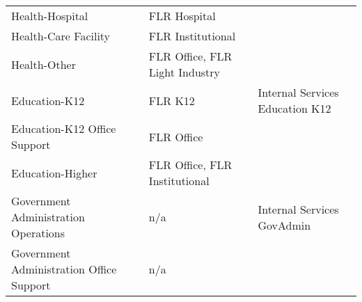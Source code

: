 \begin{table}
\begin{tabular}{|l|l|l|}
\hline
Health-Hospital                 & FLR Hospital &  \\
Health-Care Facility            & FLR Institutional &  \\
Health-Other                    & FLR Office, FLR Light Industry &  \\
\hline
Education-K12                   & FLR K12 & Internal Services Education K12 \\
Education-K12 Office Support    & FLR Office &  \\
Education-Higher                & FLR Office, FLR Institutional &  \\
\hline
Government Administration Operations & n/a & Internal Services GovAdmin \\
Government Administration Office Support & n/a &  \\
\hline
\end{tabular}
\end{table}